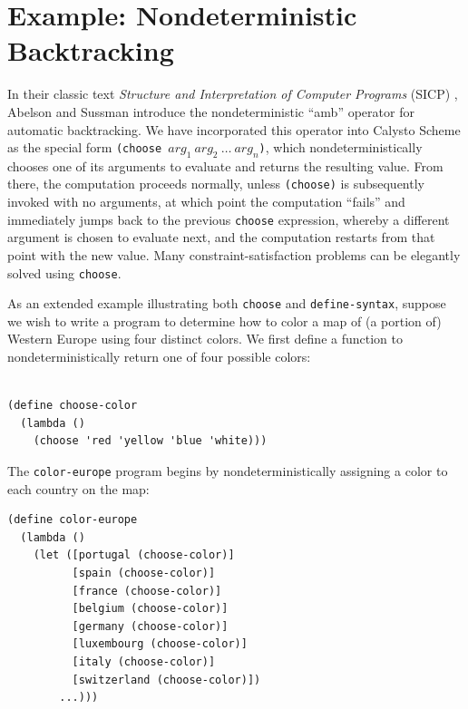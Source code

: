 \documentclass[acmsmall,screen,nonacm]{acmart}
\begin{document}
\section{Example: Nondeterministic Backtracking}

\noindent
In their classic text \emph{Structure and Interpretation of Computer Programs}
(SICP) \cite{SICP}, Abelson and Sussman introduce the nondeterministic ``amb''
operator for automatic backtracking.  We have incorporated this operator into
Calysto Scheme as the special form
\texttt{(choose~$\mathit{arg}_1~\mathit{arg}_2~\ldots~\mathit{arg}_n$)}, which
nondeterministically chooses one of its arguments to evaluate and returns the
resulting value.  From there, the computation proceeds normally, unless
\texttt{(choose)} is subsequently invoked with no arguments, at which point the
computation ``fails'' and immediately jumps back to the previous
\texttt{choose} expression, whereby a different argument is chosen to evaluate
next, and the computation restarts from that point with the new value.  Many
constraint-satisfaction problems can be elegantly solved using \texttt{choose}.

As an extended example illustrating both \texttt{choose} and
\texttt{define-syntax}, suppose we wish to write a program to determine how to
color a map of (a portion of) Western Europe using four distinct colors.  We
first define a function to nondeterministically return one of four possible
colors:\\\\

\vspace{-0.3in}

{\small
\begin{verbatim}
(define choose-color
  (lambda ()
    (choose 'red 'yellow 'blue 'white)))
\end{verbatim}
}

\noindent
The \texttt{color-europe} program begins by nondeterministically assigning a
color to each country on the map:

{\small
\begin{verbatim}
(define color-europe
  (lambda ()
    (let ([portugal (choose-color)]
          [spain (choose-color)]
          [france (choose-color)]
          [belgium (choose-color)]
          [germany (choose-color)]
          [luxembourg (choose-color)]
          [italy (choose-color)]
          [switzerland (choose-color)])
        ...)))
\end{verbatim}
}
\end{document}
